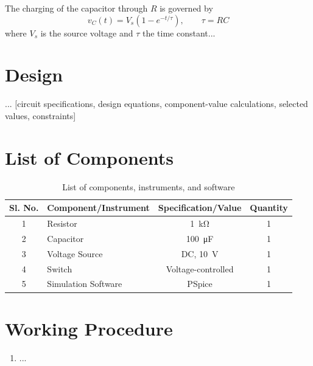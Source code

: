 \documentclass[12pt,a4paper]{article}
\begin{document}
The charging of the capacitor through $R$ is governed by
\begin{equation}
  v_C(t) = V_s \left(1 - e^{-t/\tau}\right), \qquad \tau = RC
  \label{eq:charging}
\end{equation}
where $V_s$ is the source voltage and $\tau$ the time constant...

\section{Design}
... [circuit specifications, design equations, component-value
calculations, selected values, constraints]

\section{List of Components}
\begin{table}[H]
  \centering
  \caption{List of components, instruments, and software}
  \label{tab:components}
  \begin{tabular}{clcc}
    \toprule
    Sl. No. & Component/Instrument & Specification/Value & Quantity \\
    \midrule
    1 & Resistor           & \SI{1}{\kilo\ohm}     & 1 \\
    2 & Capacitor          & \SI{100}{\micro\farad} & 1 \\
    3 & Voltage Source     & DC, \SI{10}{\volt}    & 1 \\
    4 & Switch             & Voltage-controlled    & 1 \\
    5 & Simulation Software & PSpice              & 1 \\
    \bottomrule
  \end{tabular}
\end{table}

\section{Working Procedure}
\begin{enumerate}
  \item ...
\end{enumerate}
\end{document}
